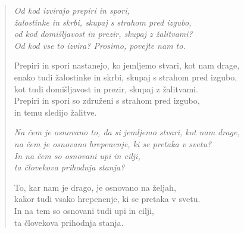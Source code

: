 \begin{verse}


\emph{Od kod izvirajo prepiri in spori,\\
žalostinke in skrbi, skupaj s strahom pred izgubo,\\
od kod domišljavost in prezir, skupaj z žalitvami?\\
Od kod vse to izvira? Prosimo, povejte nam to.}

Prepiri in spori nastanejo, ko jemljemo stvari, kot nam drage,\\
enako tudi žalostinke in skrbi, skupaj s strahom pred izgubo,\\
kot tudi domišljavost in prezir, skupaj z žalitvami.\\
Prepiri in spori so združeni s strahom pred izgubo,\\
in temu sledijo žalitve.

\emph{Na čem je osnovano to, da si jemljemo stvari, kot nam drage,}\\
\emph{na čem je osnovano hrepenenje, ki se pretaka v svetu?}\\
\emph{In na čem so osnovani upi in cilji,}\\
\emph{ta človekova prihodnja stanja?}

To, kar nam je drago, je osnovano na željah,\\
kakor tudi vsako hrepenenje, ki se pretaka v svetu.\\
In na tem so osnovani tudi upi in cilji,\\
ta človekova prihodnja stanja.

\end{verse}


